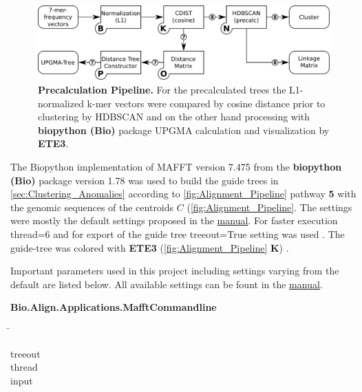 \begin{figure}[!hbt]
    \centering
    \includegraphics[width=\textwidth]{Graphics/Precalculated.pdf}
    \caption[Precalculation Pipeline]{\textbf{Precalculation Pipeline.} For the precalculated trees the L1-normalized k-mer vectors were compared by cosine distance prior to clustering by \gls{HDBSCAN} and on the other hand processing with \textbf{biopython (Bio)} package \gls{UPGMA} calculation and visualization by \textbf{ETE3}.}
    \label{fig:Precalc_Pipeline}
\end{figure}

The Biopython implementation of MAFFT version 7.475 from the \textbf{biopython (Bio)} package version 1.78 was used to build the guide trees in \autoref{sec:Clustering_Anomalies} according to \autoref{fig:Alignment_Pipeline} pathway \textsf{\textbf{5}} with the genomic sequences of the centroids $C$ \autocite{katoh_mafft_2013, cock_biopython_2009} (\autoref{fig:Alignment_Pipeline}. The settings were mostly the default settings proposed in the \href{https://mafft.cbrc.jp/alignment/software/}{manual}. For faster execution \colorbox{backcolour}{thread=6} and for export of the guide tree \colorbox{backcolour}{treeout=True} setting was used \autocite{katoh_mafft_2013, cock_biopython_2009}. The guide-tree was colored with \textbf{ETE3} (\autoref{fig:Alignment_Pipeline} \textsf{\textbf{K}}) \autocite{huerta-cepas_ete_2016}.

Important parameters used in this project including settings varying from the default are listed below. All available settings can be fount in the \href{https://mafft.cbrc.jp/alignment/software/}{manual}.

\begin{leftbar}
    \textbf{Bio.Align.Applications.MafftCommandline}
    \begin{nstabbing}
        \qquad\qquad\qquad\qquad\qquad\quad\=\kill
    
        treeout \\
        
        thread \\
        
        input 
        
    \end{nstabbing}
\end{leftbar}

